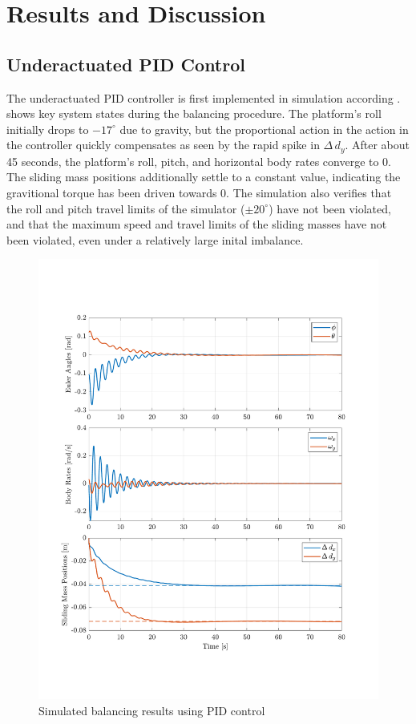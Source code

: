 \chapter{Results and Discussion}



\section{Underactuated PID Control}

The underactuated PID controller is first implemented in simulation according .  shows key system states during the balancing procedure. The platform's roll initially drops to $-17^{\circ}$ due to gravity, but the proportional action in the action in the controller quickly compensates as seen by the rapid spike in $\Delta\,d_y$. After about 45 seconds, the platform's roll, pitch, and horizontal body rates converge to 0. The sliding mass positions additionally settle to a constant value, indicating the gravitional torque has been driven towards 0. The simulation also verifies that the roll and pitch travel limits of the simulator ($\pm20^{\circ}$) have not been violated, and that the maximum speed and travel limits of the sliding masses have not been violated, even under a relatively large inital imbalance.

\begin{figure}[!ht]
    \centering
    \includegraphics[width=\linewidth]{plots/PID_sim_results.pdf}
    \caption{Simulated balancing results using PID control}
    \label{fig:PID_sim_results}
\end{figure}

